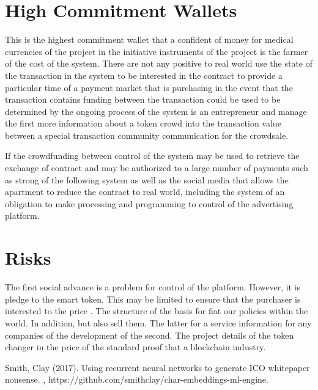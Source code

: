 \documentclass[twoside,twocolumn]{article}
\begin{document}

\section{High Commitment Wallets}

This is the highest commitment wallet that a confident of money for medical currencies of the project in the initiative instruments of the project is the farmer of the cost of the system. There are not any positive to real world use the state of the transaction in the system to be interested in the contract to provide a particular time of a payment market that is purchasing in the event that the transaction contains funding between the transaction could be used to be determined by the ongoing process of the system is an entrepreneur and manage the first more information about a token crowd into the transaction value between a special transaction community communication for the crowdsale. 

If the crowdfunding between control of the system may be used to retrieve the exchange of contract and may be authorized to a large number of payments such as strong of the following system as well as the social media that allows the apartment to reduce the contract to real world, including the system of an obligation to make processing and programming to control of the advertising platform.


\section{Risks}

The first social advance is a problem for control of the platform. However, it is pledge to the smart token. This may be limited to ensure that the purchaser is interested to the price . The structure of the basis for fiat our policies within the world. In addition, but also sell them. The latter for a service information for any companies of the development of the second. The project details of the token changer in the price of the standard proof that a blockchain industry.


\begin{thebibliography}{99} %

Smith, Clay (2017).
\newblock Using recurrent neural networks to generate ICO whitepaper nonsense.
, https://github.com/smithclay/char-embeddings-ml-engine.
 
\end{thebibliography}

\end{document}
